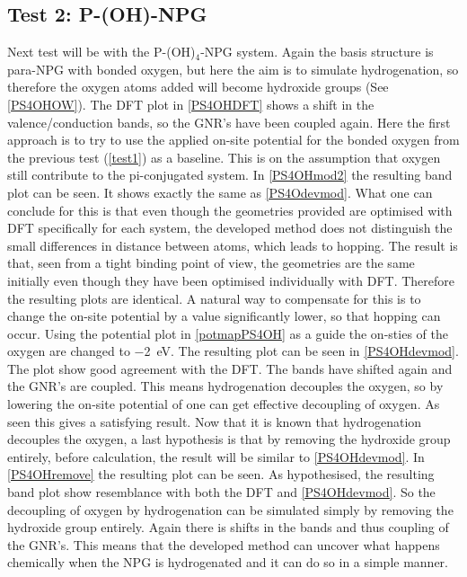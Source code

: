 \subsection{Test 2: P-(OH)-NPG}\label{test2}
Next test will be with the P-(OH)\(_4\)-NPG system. Again the basis structure is para-NPG with bonded oxygen, but here the aim is to simulate hydrogenation, so therefore the oxygen atoms added will become hydroxide groups (See \cref{PS4OHOW}). The DFT plot in \cref{PS4OHDFT} shows a shift in the valence/conduction bands, so the GNR's have been coupled again. Here the first approach is to try to use the applied on-site potential for the bonded oxygen from the previous test (\cref{test1}) as a baseline. This is on the assumption that oxygen still contribute to the pi-conjugated system. In \cref{PS4OHmod2} the resulting band plot can be seen. It shows exactly the same as \cref{PS4Odevmod}. What one can conclude for this is that even though the geometries provided are optimised with DFT specifically for each system, the developed method does not distinguish the small differences in distance between atoms, which leads to hopping. The result is that, seen from a tight binding point of view, the geometries are the same initially even though they have been optimised individually with DFT. Therefore the resulting plots are identical. A natural way to compensate for this is to change the on-site potential by a value significantly lower, so that hopping can occur. Using the potential plot in \cref{potmapPS4OH} as a guide the on-sties of the oxygen are changed to \SI{-2}{\electronvolt}. The resulting plot can be seen in \cref{PS4OHdevmod}. The plot show good agreement with the DFT. The bands have shifted again and the GNR's are coupled. This means hydrogenation decouples the oxygen, so by lowering the on-site potential of one can get effective decoupling of oxygen. As seen this gives a satisfying result. Now that it is known that hydrogenation decouples the oxygen, a last hypothesis is that by removing the hydroxide group entirely, before calculation, the result will be similar to \cref{PS4OHdevmod}. In \cref{PS4OHremove} the resulting plot can be seen. As hypothesised, the resulting band plot show resemblance with both the DFT and \cref{PS4OHdevmod}. So the decoupling of oxygen by hydrogenation can be simulated simply by removing the hydroxide group entirely. Again there is shifts in the bands and thus coupling of the GNR's. This means that the developed method can uncover what happens chemically when the NPG is hydrogenated and it can do so in a simple manner.
